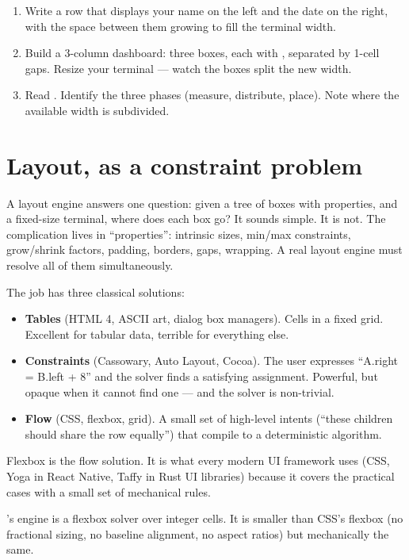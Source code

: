 \begin{enumerate}[leftmargin=*]
  \item Write a row that displays your name on the left and the date
    on the right, with the space between them growing to fill the
    terminal width.
  \item Build a 3-column dashboard: three boxes, each with
    , separated by 1-cell gaps. Resize your terminal
    --- watch the boxes split the new width.
  \item Read . Identify the three
    phases (measure, distribute, place). Note where the available
    width is subdivided.
\end{enumerate}

\section{Layout, as a constraint problem}

A layout engine answers one question: given a tree of boxes with
properties, and a fixed-size terminal, where does each box go?
It sounds simple. It is not. The complication lives in
``properties'': intrinsic sizes, min/max constraints, grow/shrink
factors, padding, borders, gaps, wrapping. A real layout engine
must resolve all of them simultaneously.

The job has three classical solutions:

\begin{itemize}[leftmargin=*]
  \item \textbf{Tables} (HTML 4, ASCII art, dialog box managers).
    Cells in a fixed grid. Excellent for tabular data, terrible
    for everything else.
  \item \textbf{Constraints} (Cassowary, Auto Layout, Cocoa).
    The user expresses ``A.right = B.left + 8'' and the solver
    finds a satisfying assignment. Powerful, but opaque when it
    cannot find one --- and the solver is non-trivial.
  \item \textbf{Flow} (CSS, flexbox, grid). A small set of
    high-level intents (``these children should share the row
    equally'') that compile to a deterministic algorithm.
\end{itemize}

Flexbox is the flow solution. It is what every modern UI
framework uses (CSS, Yoga in React Native, Taffy in Rust UI
libraries) because it covers the practical cases with a small
set of mechanical rules.

\maya{}'s engine is a flexbox solver over integer cells. It is
smaller than CSS's flexbox (no fractional sizing, no baseline
alignment, no aspect ratios) but mechanically the same.

